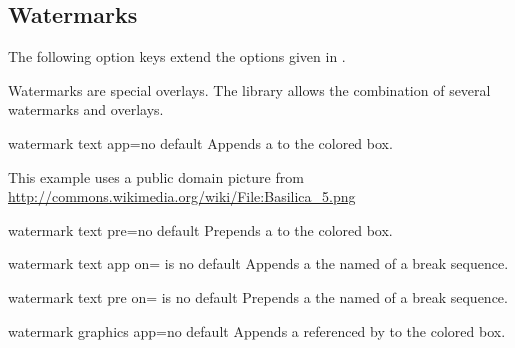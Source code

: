 \clearpage
\subsection{Watermarks}
The following option keys extend the options given in .

\begin{marker}
Watermarks are special overlays. The  library allows the combination
of several watermarks and overlays.
\end{marker}

\begin{docTcbKey}{watermark text app}{=}{no default}
  Appends a  to the colored box.
\begin{dispExample}

\begin{tcolorbox}[enhanced,title=My title,watermark graphics=Basilica_5.png,
  watermark opacity=0.25,
  watermark text app=Basilica,watermark color=Navy
  ]
\lipsum[1-2]
\tcblower
This example uses a public domain picture from\\
\url{http://commons.wikimedia.org/wiki/File:Basilica_5.png}
\end{tcolorbox}
\end{dispExample}
\end{docTcbKey}

\begin{docTcbKey}{watermark text pre}{=}{no default}
  Prepends a  to the colored box.
\end{docTcbKey}

\begin{docTcbKey}{watermark text app on}{= is }{no default}
  Appends a  the named  of a break sequence.
\end{docTcbKey}

\begin{docTcbKey}{watermark text pre on}{= is }{no default}
  Prepends a  the named  of a break sequence.
\end{docTcbKey}

\clearpage
\begin{docTcbKey}{watermark graphics app}{=}{no default}
  Appends a  referenced by  to the colored box.
\end{docTcbKey}

